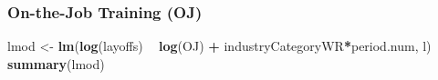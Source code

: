 \documentclass[
]{article}
\newenvironment{Shaded}{\begin{snugshade}}{\end{snugshade}}
\newcommand{\KeywordTok}[1]{\textcolor[rgb]{0.13,0.29,0.53}{\textbf{#1}}}
\newcommand{\NormalTok}[1]{#1}
\newcommand{\OperatorTok}[1]{\textcolor[rgb]{0.81,0.36,0.00}{\textbf{#1}}}
\newcommand{\StringTok}[1]{\textcolor[rgb]{0.31,0.60,0.02}{#1}}
\begin{document}
\hypertarget{on-the-job-training-oj-3}{%
\subsubsection{On-the-Job Training
(OJ)}\label{on-the-job-training-oj-3}}

\begin{Shaded}
\begin{Highlighting}[]
\NormalTok{lmod <-}\StringTok{ }\KeywordTok{lm}\NormalTok{(}\KeywordTok{log}\NormalTok{(layoffs) }\OperatorTok{~}\StringTok{ }\KeywordTok{log}\NormalTok{(OJ) }\OperatorTok{+}\StringTok{ }\NormalTok{industryCategoryWR}\OperatorTok{*}\NormalTok{period.num, l)}
\KeywordTok{summary}\NormalTok{(lmod)}
\end{Highlighting}
\end{Shaded}
\end{document}
